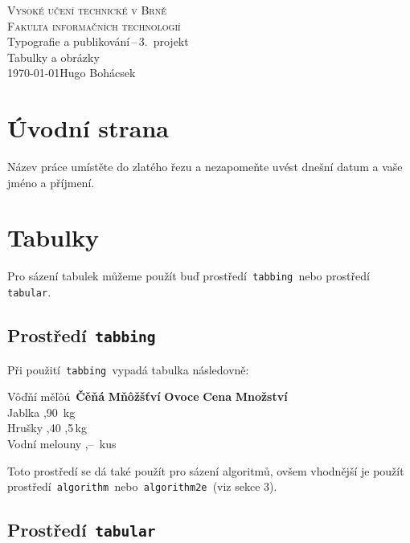 \documentclass[a4paper, 11pt]{article}
\begin{document}
\begin{titlepage}
	\begin{center}
		{\Huge \textsc{Vysoké učení technické v Brně}\\}
		{\huge \textsc{Fakulta informačních technologií}\\}
		{\LARGE Typografie a publikování\,--\,3.\ projekt\\}
		{\Huge Tabulky a obrázky\\}
		{\Large \today \hfill Hugo Bohácsek}
	\end{center}
\end{titlepage}

\section{Úvodní strana}

Název práce umístěte do zlatého řezu a nezapomeňte uvést dnešní datum a vaše jméno a příjmení.

\section{Tabulky}

Pro sázení tabulek můžeme použít buď prostředí\texttt{ tabbing }nebo prostředí\texttt{ tabular}.

\subsection{Prostředí\texttt{ tabbing}}

Při použití\texttt{ tabbing }vypadá tabulka následovně:
%
\begin{tabbing}
Vôďňí měľôú\, \quad  \= \textbf{Čěňá} \quad \= \textbf{Mňôžšťví}\kill
\textbf{Ovoce} \> \textbf{Cena} \> \textbf{Množství} \\
Jablka ,90 \,kg\\
Hrušky ,40 ,5\,kg\\
Vodní melouny ,-- \,kus\\
\end{tabbing}
Toto prostředí se dá také použít pro sázení algoritmů, ovšem vhodnější je použít prostředí\texttt{ algorithm }nebo\texttt{ algorithm2e }(viz sekce 3).

\subsection{Prostředí\texttt{ tabular}}
\end{document}
